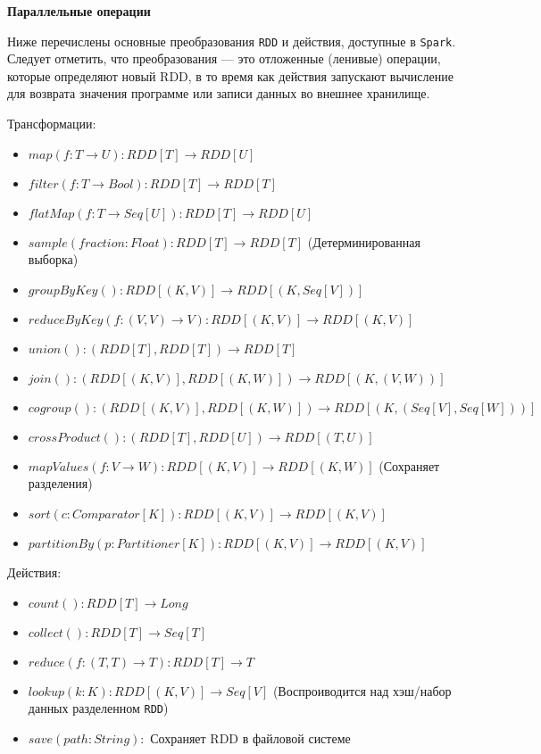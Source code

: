 \textbf{Параллельные операции}

Ниже перечислены основные преобразования \texttt{RDD} и действия, доступные в \texttt{Spark}. 
Следует отметить, что преобразования --- это отложенные (ленивые) операции, которые определяют новый RDD, в то время как действия запускают вычисление для возврата значения программе или записи данных во внешнее хранилище.

Трансформации: 
\begin{itemize}
  \item $map( f : T \rightarrow U) : RDD[T] \rightarrow RDD[U]$  
  \item $filter( f : T \rightarrow Bool) : RDD[T] \rightarrow RDD[T]$ 
  \item $flatMap( f : T \rightarrow Seq[U]) : RDD[T] \rightarrow RDD[U]$
  \item $sample(fraction : Float) : RDD[T] \rightarrow RDD[T]$ (Детерминированная выборка) 
  \item $groupByKey() : RDD[(K, V)] \rightarrow RDD[(K, Seq[V])]$ 
  \item $reduceByKey( f : (V, V) \rightarrow V) : RDD[(K, V)] \rightarrow RDD[(K, V)]$ 
  \item $union() : (RDD[T], RDD[T]) \rightarrow RDD[T]$ 
  \item $join() : (RDD[(K, V)], RDD[(K, W)]) \rightarrow RDD[(K, (V, W))]$ 
  \item $cogroup() : (RDD[(K, V)], RDD[(K, W)]) \rightarrow RDD[(K, (Seq[V], Seq[W]))]$ 
  \item $crossProduct() : (RDD[T], RDD[U]) \rightarrow RDD[(T, U)]$ 
  \item $mapValues( f : V \rightarrow W) : RDD[(K, V)] \rightarrow RDD[(K, W)]$ (Сохраняет разделения) 
  \item $sort(c : Comparator[K]) : RDD[(K, V)] \rightarrow RDD[(K, V)]$ 
  \item $partitionBy(p : Partitioner[K]) : RDD[(K, V)] \rightarrow RDD[(K, V)]$ 
\end{itemize}

Действия:
\begin{itemize}
  \item $count() : RDD[T] \rightarrow Long$
  \item $collect() : RDD[T] \rightarrow Seq[T]$
  \item $reduce( f : (T, T) \rightarrow T) : RDD[T] \rightarrow T$
  \item $lookup(k : K) : RDD[(K, V)] \rightarrow Seq[V]$ (Воспроиводится над хэш/набор данных разделенном \texttt{RDD})
  \item $save(path : String) : $ Сохраняет RDD в файловой системе
\end{itemize}

